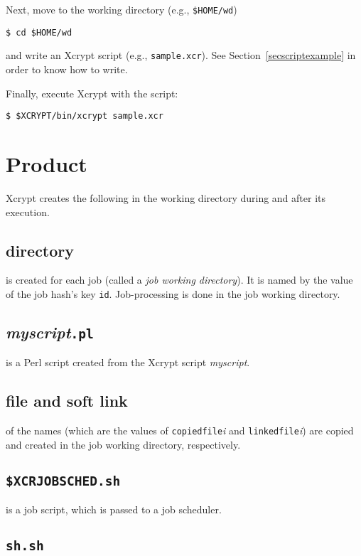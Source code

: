 \documentclass[a4paper,10pt]{report}
\begin{document}
Next, move to the working directory (e.g., \texttt{\$HOME/wd})
\begin{screen}
\texttt{\$ cd \$HOME/wd}
\end{screen}
and write an Xcrypt script (e.g., \texttt{sample.xcr}).  See
Section~\ref{secscriptexample} in order to know how to write.

Finally, execute Xcrypt with the script:
\begin{screen}
\texttt{\$ \$XCRYPT/bin/xcrypt sample.xcr}
\end{screen}

\section{Product}\label{sec:created}

Xcrypt creates the following in the working directory
during and after its execution.

\subsection*{directory}

is created for each job (called a \textit{job working directory}).  It is
named by the value of the job hash's key \texttt{id}.  Job-processing
is done in the job working directory.

\subsection*{\textit{myscript}\texttt{.pl}}

is a Perl script created from the Xcrypt script \textit{myscript}.

\subsection*{file and soft link}

of the names (which are the values of \texttt{copiedfile}\textit{i}
and \texttt{linkedfile}\textit{i}) are copied and created in the job
working directory, respectively.

\subsection*{\texttt{\$XCRJOBSCHED.sh}}

is a job script, which is passed to a job scheduler.

\subsection*{\texttt{sh.sh}}
\end{document}
